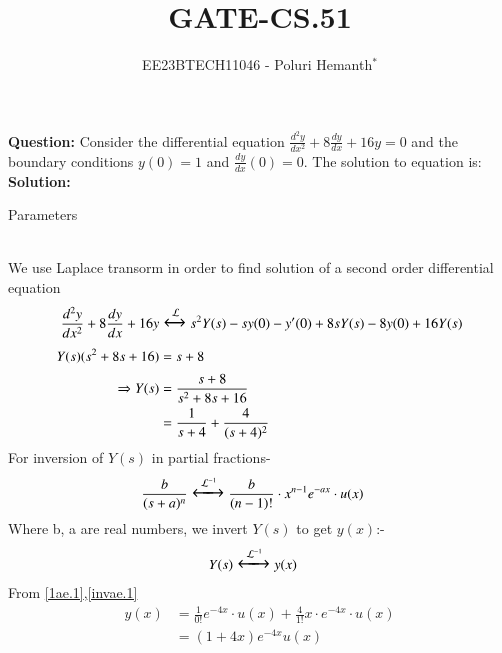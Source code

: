 \documentclass[journal,12pt,twocolumn]{IEEEtran}
\theoremstyle{remark}
\begin{document}

\vspace{3cm}

\title{GATE-CS.51}
\author{EE23BTECH11046 - Poluri Hemanth$^{*}$}
\maketitle
\textbf{Question:}
Consider the differential equation $\frac{d^2y}{dx^2}+8\frac{dy}{dx}+16y=0$ and the boundary conditions $y(0)=1$ and $\frac{dy}{dx}(0)=0$. The solution to equation is:
\textbf{Solution:}\\
\begin{table}[h!]
        
        \caption{Parameters}
        \label{tab:es.47}
\end{table}\\
We use Laplace transorm in order to find solution of a second order differential equation
\begin{align}
	\frac{d^2y}{dx^2}+8\frac{dy}{dx}+16y&\Large\xleftrightarrow{\mathcal{L}}s^2Y(s)-sy(0)-y'(0)+8sY(s)-8y(0)+16Y(s)\\
	Y(s)(s^2+8s+16)&=s+8\\
	\Rightarrow Y(s)&=\frac{s+8}{s^2+8s+16}\\
	&=\frac{1}{s+4}+\frac{4}{(s+4)^2}\label{1ae.1}
\end{align}
For inversion of $Y(s)$ in partial fractions-
\begin{align}
	&\frac{b}{(s+a)^n}\Large\xleftrightarrow{\mathcal{L}^{-1}}\frac{b}{(n-1)!}\cdot x^{n-1} e^{-ax}\cdot u(x)\label{invae.1}
\end{align}
Where b, a are real numbers, we invert $Y(s)$ to get $y(x)$:-\\
\begin{align}
        &Y(s)\Large\xleftrightarrow{\mathcal{L}^{-1}} y(x)
\end{align}
From \eqref{1ae.1},\eqref{invae.1}
\begin{align}
	y(x)&=\frac{1}{0!} e^{-4x}\cdot u(x)+\frac{4}{1!}x\cdot e^{-4x}\cdot u(x)\\
	&=(1+4x)e^{-4x}u(x)
\end{align}
\\
\\
\\
\\
\\
\\
\\
\end{document}
